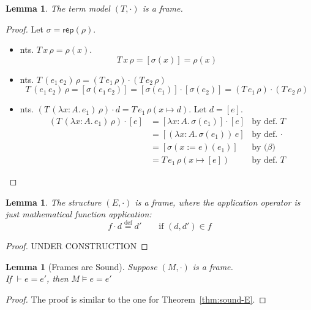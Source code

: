 \documentclass{tufte-handout}
\newcommand{\defeq}[0]{\overset{\mathrm{def}}{=}}
\newcommand{\LAM}[1]{\lambda #1.\,}
\newcommand{\APP}[0]{\,}
\newcommand{\of}[0]{\!:\!}
\newcommand{\by}[0]{\!:=\!}
\newcommand{\ext}[3]{#3(#1{\mapsto}#2)}
\newtheorem{lemma}[theorem]{Lemma}
\begin{document}
\begin{lemma}
  \label{lem:term-frame}
  The term model $(T,\cdot)$ is a frame.
\end{lemma}
\begin{proof} Let $\sigma = \mathsf{rep}(\rho)$.
  \begin{itemize}
  \item nts. $T\,x\,\rho = \rho(x)$.
    \[
     T\,x\,\rho = [\sigma(x)] = \rho(x)
    \]
    
  \item nts. $T\,(e_1\APP e_2)\,\rho = (T\,e_1\,\rho) \cdot (T\,e_2\,\rho)$
    \[
    T\,(e_1\APP e_2)\,\rho
    = [\sigma(e_1\APP e_2)]
    = [\sigma(e_1)] \cdot [\sigma(e_2)]
    = (T\,e_1\,\rho ) \cdot (T\,e_2\,\rho)
    \]

  \item nts. $(T\,(\LAM{x\of A} e_1)\,\rho) \cdot d =
    T\,e_1\,\ext{x}{d}{\rho}$. Let $d=[e]$.
    \begin{align*}
    (T\,(\LAM{x\of A} e_1)\,\rho) \cdot [e]
    &= [\LAM{x\of A}\sigma(e_1)] \cdot [e] & \text{by def. $T$}\\
    &= [(\LAM{x\of A}\sigma(e_1)) \APP e] & \text{by def. $\cdot$}\\
    &= [\sigma(x\by e)(e_1)] & \text{by ($\beta$)}\\
    &= T\,e_1\,\ext{x}{[e]}{\rho} & \text{by def. $T$}
    \end{align*}
    
  \end{itemize}
  
\end{proof}

\begin{lemma}
\label{lem:E-frame}
The structure $(E,\cdot)$ is a frame, where the application operator
is just mathematical function application:
\[
   f \cdot d \defeq d' \qquad \text{if } (d,d') \in f
\]
\end{lemma}
\begin{proof}
  UNDER CONSTRUCTION
\end{proof}

\begin{lemma}[Frames are Sound]
  \label{lem:frame-sound}
  Suppose $(M,\cdot)$ is a frame.\\
  If $\vdash e = e'$, then $M \models e = e'$
\end{lemma}
\begin{proof}
    The proof is similar to the one for Theorem~\ref{thm:sound-E}.
\end{proof}
\end{document}
